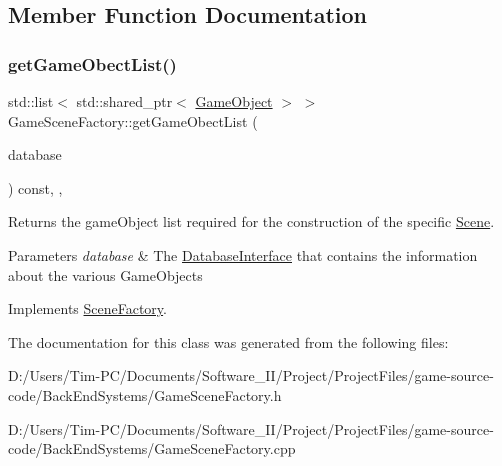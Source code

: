 \subsection{Member Function Documentation}
\mbox{\label{class_game_scene_factory_a2db801c1a1703a14a00c7b6e8bdca5b0}} 
\subsubsection{\texorpdfstring{get\+Game\+Obect\+List()}{getGameObectList()}}
{\footnotesize\ttfamily std\+::list$<$ std\+::shared\+\_\+ptr$<$ \hyperlink{class_game_object}{Game\+Object} $>$ $>$ Game\+Scene\+Factory\+::get\+Game\+Obect\+List (\begin{DoxyParamCaption}\item[{std\+::shared\+\_\+ptr$<$ \hyperlink{class_database_interface}{Database\+Interface} $>$}]{database }\end{DoxyParamCaption}) const\hspace{0.3cm}{\ttfamily [override]}, {\ttfamily [protected]}, {\ttfamily [virtual]}}



Returns the game\+Object list required for the construction of the specific \hyperlink{class_scene}{Scene}. 


\begin{DoxyParams}{Parameters}
{\em database} & The \hyperlink{class_database_interface}{Database\+Interface} that contains the information about the various Game\+Objects \\
\hline
\end{DoxyParams}


Implements \hyperlink{class_scene_factory_a2c8541230e95df49d2ab39b7c6ecdb78}{Scene\+Factory}.



The documentation for this class was generated from the following files\+:\begin{DoxyCompactItemize}
\item 
D\+:/\+Users/\+Tim-\/\+P\+C/\+Documents/\+Software\+\_\+\+I\+I/\+Project/\+Project\+Files/game-\/source-\/code/\+Back\+End\+Systems/Game\+Scene\+Factory.\+h\item 
D\+:/\+Users/\+Tim-\/\+P\+C/\+Documents/\+Software\+\_\+\+I\+I/\+Project/\+Project\+Files/game-\/source-\/code/\+Back\+End\+Systems/Game\+Scene\+Factory.\+cpp\end{DoxyCompactItemize}
